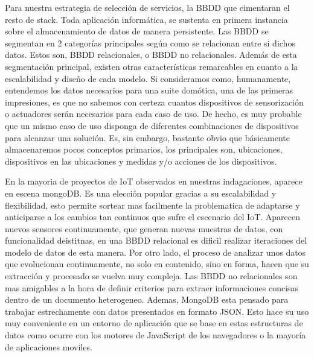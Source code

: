 \vspace{1.5cm}

Para nuestra estrategia de selección de servicios, la BBDD que cimentaran el resto de stack. Toda aplicación informática, se sustenta en primera instancia sobre el almacenamiento de datos de manera persistente. Las BBDD se segmentan en 2 categorías principales según como se relacionan entre si dichos datos. Estos son, BBDD relacionales, o BBDD no relacionales. Además de esta segmentación principal, existen otras características remarcables en cuanto a la escalabilidad y diseño de cada modelo. Si consideramos como, humanamente, entendemos los datos necesarios para una suite domótica, una de las primeras impresiones, es que no sabemos con certeza cuantos dispositivos de sensorización o actuadores serán necesarios para cada caso de uso. De hecho, es muy probable que un mismo caso de uso disponga de diferentes combinaciones de dispositivos para alcanzar una solución. Es, sin embargo, bastante obvio que básicamente almacenaremos pocos conceptos primarios, los principales son, ubicaciones, dispositivos en las ubicaciones y medidas y/o acciones de los dispositivos.

\vspace{1.5cm}

En la mayoria de proyectos de IoT observados en nuestras indagaciones, aparece en escena mongoDB. Es una elección popular gracias a su escalabilidad y flexibilidad, esto permite sortear mas facilmente la problematica de adaptarse y anticiparse a los cambios tan continuos que sufre el escenario del IoT. Aparecen nuevos sensores continuamente, que generan nuevas muestras de datos, con funcionalidad deistitnas, en una BBDD relacional es dificil realizar iteraciones del modelo de datos de esta manera. Por otro lado, el proceso de analizar unos datos que evolucionan continuamente, no solo en contenido, sino en forma, hacen que su extracción y procesado se vuelva muy compleja. Las BBDD no relacionales son mas amigables a la hora de definir criterios para extraer informaciones concisas dentro de un documento heterogeneo. Ademas, MongoDB esta pensado para trabajar estrechamente con datos presentados en formato JSON. Esto hace su uso muy conveniente en un entorno de aplicación que se base en estas estructuras de datos como ocurre con los motores de JavaScript de los navegadores o la mayoría de aplicaciones moviles.

\vspace{1.5cm}

